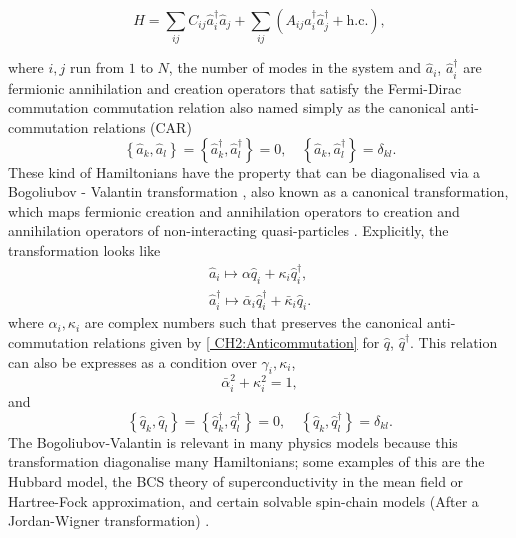 \begin{equation}
\hat{H}=\sum_{i j} C_{i j} \hat{a}_{i}^{\dagger} \hat{a}_{j}+\sum_{i j}\left(A_{i j} \hat{a}_{i}^{\dagger}\hat{a}_{j}^{\dagger}+\mathrm{h.c.}\right),
\label{CH2:QuadraticHamiltonian}
\end{equation}

where $i,j$ run from $1$ to $N$, the number of modes in the system and $\hat{a}_i$, $\hat{a}^{\dagger}_i$ are fermionic annihilation and creation operators that satisfy the Fermi-Dirac commutation commutation relation also named simply as the canonical anti-commutation relations (CAR) \cite{fradkin_field_1997, Mario_2018}
\begin{equation}
\left\{\hat{a}_{k}, \hat{a}_{l}\right\}=\left\{\hat{a}_{k}^{\dagger}, \hat{a}_{l}^{\dagger}\right\}=0, \quad\left\{\hat{a}_{k}, \hat{a}_{l}^{\dagger}\right\}=\delta_{k l}.
\label{CH2:Anticommutation}
\end{equation}
These kind of Hamiltonians have the property that can be diagonalised via a Bogoliubov - Valantin transformation \cite{bogoljubov_new_1958,Mario_2018}, also known as a canonical transformation, which maps fermionic creation and annihilation operators to creation and annihilation operators of non-interacting quasi-particles \cite{berezin_method_1966, bogoljubov_new_1958}. Explicitly, the transformation looks like
\begin{equation}
\begin{array}{c}
\hat{a}_{i} \mapsto \alpha \hat{q}_{i}+\kappa_{i} \hat{q}_{i}^{\dagger}, \\
\hat{a}_{i}^{\dagger} \mapsto \bar{\alpha}_{i} \hat{q}_{i}^{\dagger}+\bar{\kappa}_{i} \hat{q}_{i}.
\end{array}
\label{CH2:Bogoliuvov}
\end{equation}
where $\alpha_i , \kappa_i$ are complex numbers such that preserves the canonical anti-commutation relations given by \eqref{ CH2:Anticommutation} for $\hat{q}$, $\hat{q}^{\dagger}$. This relation can also be expresses as a condition over $\gamma_i, \kappa_i$,
\begin{equation}
 \bar{\alpha}_i ^2+ \kappa_i^2 = 1,
\end{equation}
and 
\begin{equation}
	\left\{\hat{q}_{k}, \hat{q}_{l}\right\}=\left\{\hat{q}_{k}^{\dagger}, \hat{q}_{l}^{\dagger}\right\}=0, \quad\left\{\hat{q}_{k}, \hat{q}_{l}^{\dagger}\right\}=\delta_{k l}.
\end{equation}
The Bogoliubov-Valantin is relevant in many physics models because this transformation diagonalise many Hamiltonians; some examples of this are the Hubbard model, the BCS theory of superconductivity in the mean field or Hartree-Fock approximation, and certain solvable spin-chain models (After a Jordan-Wigner transformation) \cite{katsura_statistical_1962, barouch_statistical_1971, barouch_statistical_1970,fradkin_field_1997}.\\

